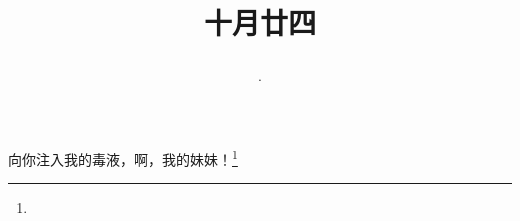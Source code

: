 \title{\date[d=24,m=11,y=2024][year:cn-y,年,month:cn,day:cn,日,·,weekday]·十月廿四 }
向你注入我的毒液，啊，我的妹妹！\footnote{ }

